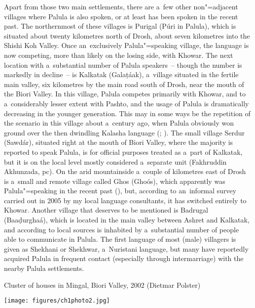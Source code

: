 Apart from those two main settlements, there are a~few other non"=adjacent villages where Palula is also spoken, or at least has been spoken in the recent past. The northernmost of these villages is Purigal (Púri in Palula), which is situated about twenty kilometres north of Drosh, about seven kilometres into the Shishi Koh Valley. Once an~exclusively Palula"=speaking village, the language is now competing, more than likely on the losing side, with Khowar. The next location with a~substantial number of Palula speakers~-- though the number is markedly in decline~-- is Kalkatak (Galaṭáak), a~village situated in the fertile main valley, six kilometres by the main road south of Drosh, near the mouth of the Biori Valley. In this village, Palula competes primarily with Khowar, and to a~considerably lesser extent with Pashto, and the usage of Palula is dramatically decreasing in the younger generation. This may in some ways be the repetition of the scenario in this village about a~century ago, when Palula obviously won ground over the then dwindling Kalasha language (\citealt[165]{decker1996}; \citealt[95]{cacopardo2001}). The small village Serdur (Sawdár), situated right at the mouth of Biori Valley, where the majority is reported to speak Palula, is for official purposes treated as a~part of Kalkatak, but it is on the local level mostly considered a~separate unit (Fakhruddin Akhunzada, pc). On the arid mountainside a~couple of kilometres east of Drosh is a~small and remote village called Ghos (Ghoós), which apparently was Palula"=speaking in the recent past (\citealt[75, 84]{decker1992a}), but, according to an~informal survey carried out in 2005 by my local language consultants, it has switched entirely to Khowar. Another village that deserves to be mentioned is Badrugal (Baaḍurghaá), which is located in the main valley between Ashret and Kalkatak, and according to local sources is inhabited by a~substantial number of people able to communicate in Palula. The first language of most (male) villagers is given as Shekhani or Shekhwar, a~Nuristani language, but many have reportedly acquired Palula in frequent contact (especially through intermarriage) with the nearby Palula settlements. 


\begin{photofigure}[t]
\caption{Cluster of houses in Mingal, Biori Valley, 2002 (Dietmar Polster)}
\texttt{[image: figures/ch1photo2.jpg]}
\end{photofigure}


